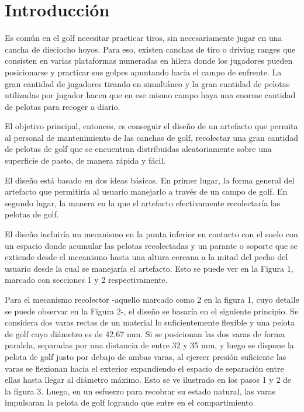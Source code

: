 \section*{Introducción}

Es común en el golf necesitar practicar tiros, sin necesariamente jugar en una cancha de dieciocho hoyos. Para eso, existen canchas de tiro o driving ranges que consisten en varias plataformas numeradas en hilera donde los jugadores pueden posicionarse y practicar sus golpes apuntando hacia el campo de enfrente. La gran cantidad de jugadores tirando en simultáneo y la gran cantidad de pelotas utilizadas por jugador hacen que en ese mismo campo haya una enorme cantidad de pelotas para recoger a diario.

El objetivo principal, entonces, es conseguir el diseño de un artefacto que permita al personal de mantenimiento de las canchas de golf, recolectar una gran cantidad de pelotas de golf que se encuentran distribuidas aleatoriamente sobre una superficie de pasto, de manera rápida y fácil.

El diseño está basado en dos ideas básicas. En primer lugar, la forma general del artefacto que permitiría al usuario manejarlo a través de un campo de golf. En segundo lugar, la manera en la que el artefacto efectivamente recolectaría las pelotas de golf.

El diseño incluiría un mecanismo en la punta inferior en contacto con el suelo con un espacio donde acumular las pelotas recolectadas y un parante o soporte que se extiende desde el mecanismo hasta una altura cercana a la mitad del pecho del usuario desde la cual se manejaría el artefacto. Esto se puede ver en la Figura 1, marcado con secciones 1 y 2 respectivamente.

Para el mecanismo recolector -aquello marcado como 2 en la figura 1, cuyo detalle se puede observar en la Figura 2-, el diseño se basaría en el siguiente principio. Se considera dos varas rectas de un material lo suficientemente flexible y una pelota de golf cuyo diámetro es de 42,67 mm. Si se posicionan las dos varas de forma paralela, separadas por una distancia de entre 32 y 35 mm, y luego se dispone la pelota de golf justo por debajo de ambas varas, al ejercer presión suficiente las varas se flexionan hacia el exterior expandiendo el espacio de separación entre ellas hasta llegar al diámetro máximo. Esto se ve ilustrado en los pasos 1 y 2 de la figura 3. Luego, en un esfuerzo para recobrar su estado natural, las varas impulsaran la pelota de golf logrando que entre en el compartimiento.

